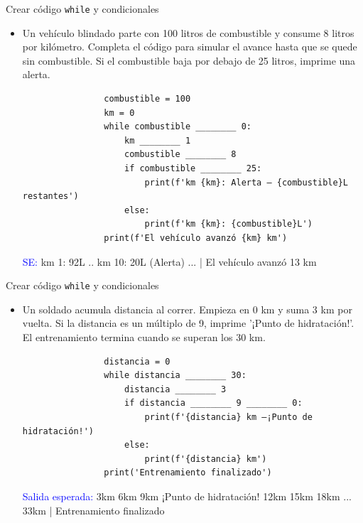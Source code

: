 \documentclass{beamer}
\begin{document}
    \begin{frame}[fragile,t]{Crear código \texttt{while} y condicionales}
        \begin{itemize}
            \item Un vehículo blindado parte con 100 litros de combustible y consume 8 litros por kilómetro. Completa el código para simular el avance hasta que se quede sin combustible. Si el combustible baja por debajo de 25 litros, imprime una alerta.
            \begin{verbatim}
                combustible = 100
                km = 0
                while combustible ________ 0:
                    km ________ 1
                    combustible ________ 8
                    if combustible ________ 25:
                        print(f'km {km}: Alerta — {combustible}L restantes')
                    else:
                        print(f'km {km}: {combustible}L')
                print(f'El vehículo avanzó {km} km')
            \end{verbatim}
            \textcolor{blue}{SE:} km 1: 92L .. km 10: 20L (Alerta)  ... |  El vehículo avanzó 13 km
        \end{itemize}
    \end{frame}

    \begin{frame}[fragile, t]{Crear código \texttt{while} y condicionales}
        \begin{itemize}
            \item Un soldado acumula distancia al correr. Empieza en 0 km y suma 3 km por vuelta. Si la distancia es un múltiplo de 9, imprime '¡Punto de hidratación!'. El entrenamiento termina cuando se superan los 30 km.
            \begin{verbatim}
                distancia = 0
                while distancia ________ 30:
                    distancia ________ 3
                    if distancia ________ 9 ________ 0:
                        print(f'{distancia} km —¡Punto de hidratación!')
                    else:
                        print(f'{distancia} km')
                print('Entrenamiento finalizado')
            \end{verbatim}
            \textcolor{blue}{Salida esperada:} 3km  6km  9km ¡Punto de hidratación!  12km  15km  18km  ...  33km | Entrenamiento finalizado
        \end{itemize}
    \end{frame}
\end{document}
